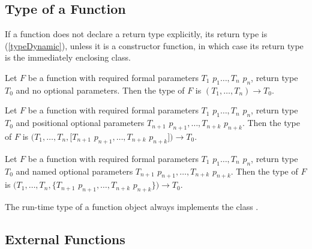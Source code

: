 \documentclass{article}
\begin{document}
\subsection{Type of a Function}

\LMHash{}
If a function does not declare a return type explicitly, its return type is \DYNAMIC{} (\ref{typeDynamic}), unless it is a constructor function, in which case its return type is the immediately enclosing class.

\LMHash{}
Let $F$ be a function with required formal parameters $T_1$ $p_1 \ldots, T_n$ $p_n$, return type $T_0$ and no optional parameters.
Then the type of $F$ is $(T_1 ,\ldots, T_n) \rightarrow T_0$.

\LMHash{}
Let $F$ be a function with required formal parameters $T_1$ $p_1 \ldots, T_n$ $p_n$, return type $T_0$ and positional optional parameters $T_{n+1}$ $p_{n+1}, \ldots, T_{n+k}$ $ p_{n+k}$.
Then the type of $F$ is $(T_1 ,\ldots, T_n, [T_{n+1}$ $p_{n+1}, \ldots, T_{n+k}$ $p_{n+k}]) \rightarrow T_0$.

\LMHash{}
Let $F$ be a function with required formal parameters $T_1$ $p_1 \ldots, T_n$ $p_n$, return type $T_0$ and named optional parameters $T_{n+1}$ $p_{n+1}, \ldots, T_{n+k}$ $ p_{n+k}$.
Then the type of $F$ is $(T_1 ,\ldots, T_n, \{T_{n+1}$ $p_{n+1}, \ldots, T_{n+k}$ $p_{n+k}\}) \rightarrow T_0$.

\LMHash{}
The run-time type of a function object always implements the class .




\subsection{External Functions}
\end{document}
